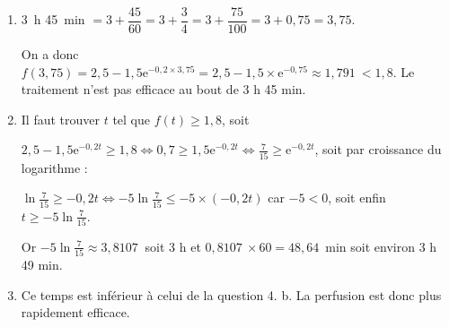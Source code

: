 \documentclass[10pt]{article}
\providecommand{\np}[2][]{{#2~#1}}
\begin{document}
\begin{enumerate}
\item 
 3~h 45~min $= 3 + \dfrac{45}{60} = 3 + \dfrac{3}{4} = 3 + \dfrac{75}{100} = 3 + 0,75 = 3,75$.
 
 On a donc $f(3,75) = 2,5 - 1,5\text{e}^{-0,2 \times 3,75} = 2,5 - 1,5 \times \text{e}^{-0,75} \approx \np{1,791} <  1,8$. Le traitement n'est pas efficace au bout de 3 h 45 min.
\item 
Il faut trouver $t$ tel que $f(t) \geqslant 1,8$, soit

$2,5 - 1,5\text{e}^{-0,2t} \geqslant 1,8 \iff 0,7 \geqslant 1,5\text{e}^{-0,2t} \iff \frac{7}{15} \geqslant \text{e}^{-0,2t}$, soit par croissance du logarithme :

$\ln \frac{7}{15} \geqslant - 0,2t \iff -5\ln \frac{7}{15} \leqslant -5 \times (- 0,2t)$ car $- 5 < 0$, soit enfin $t \geqslant  -5\ln \frac{7}{15}$.

Or $ -5\ln \frac{7}{15} \approx \np{3,8107}$ soit 3 h et $\np{0,8107} \times 60 = 48,64$~min soit environ 3 h 49 min.
\item 
Ce temps est inférieur à celui de la question 4. b. La perfusion est donc plus rapidement efficace.
\end{enumerate}

\bigskip
\end{document}
